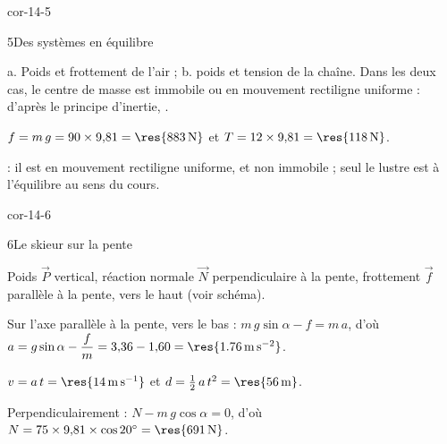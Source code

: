 \begin{blocLivre}{cor-14-5}
\begin{corrige}{5}{Des systèmes en équilibre}
\begin{questions}
\item a. Poids et frottement de l'air ; b. poids et tension de la chaîne. Dans les deux cas, le centre de masse est
immobile ou en mouvement rectiligne uniforme : d'après le principe d'inertie, .
\item $f=m\,g=90\times9{,}81=\res{\qty{883}{N}}$ et $T=12\times9{,}81=\res{\qty{118}{N}}$.
\item {} : il est en mouvement rectiligne uniforme, et non immobile ; seul le lustre est à l'équilibre au
sens du cours.
\end{questions}
\end{corrige}
\end{blocLivre}
\begin{blocLivre}{cor-14-6}
\begin{corrige}{6}{Le skieur sur la pente}
\begin{questions}
\item Poids $\vec{P}$ vertical, réaction normale $\vec{N}$ perpendiculaire à la pente, frottement $\vec{f}$ parallèle à
la pente, vers le haut (voir schéma).
\item Sur l'axe parallèle à la pente, vers le bas : $m\,g\sin\alpha-f=m\,a$, d'où
$a=g\sin\alpha-\dfrac{f}{m}=3{,}36-1{,}60=\res{\qty{1,76}{m.s^{-2}}}$.
\item $v=a\,t=\res{\qty{14}{m.s^{-1}}}$ et $d=\frac12\,a\,t^2=\res{\qty{56}{m}}$.
\item Perpendiculairement : $N-m\,g\cos\alpha=0$, d'où $N=75\times9{,}81\times\cos20^\circ=\res{\qty{691}{N}}$.
\end{questions}
\end{corrige}
\end{blocLivre}
